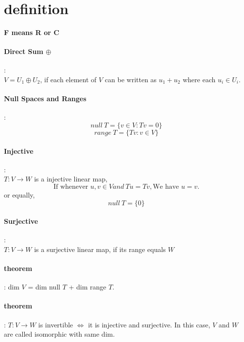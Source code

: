 \documentclass[letterpaper]{article}
\begin{document}
	
\section{definition}
\paragraph{F means R or C}
\paragraph{Direct Sum $\oplus$}:\\
$V=U_1\oplus U_2$, if each element of $V$ can be written as $u_1+u_2$ where each $u_i \in U_i$.
\paragraph{Null Spaces and Ranges}:\\
\begin{displaymath}
null\ T = \{v \in V : Tv = 0\}
\end{displaymath}
\begin{displaymath}
range\ T = \{Tv  : v \in V\}
\end{displaymath}
\paragraph{Injective}:\\
$T: V \to W$ is a injective linear map,
\begin{displaymath}
\textrm{If whenever }u,v \in V and\  Tu=Tv, \textrm{We have }u=v.
\end{displaymath}
or equally,
\begin{displaymath}
null\ T =\{0\}
\end{displaymath}
\paragraph{Surjective}:\\
$T: V \to W$ is a surjective linear map, if its range equals $W$
\paragraph{theorem}:
dim $V$ = dim null $T$ + dim range $T$.
\paragraph{theorem}:
$T: V \to W$ is invertible $\iff$ it is injective and surjective. In this case, $V$ and $W$ are called isomorphic with same dim.
\end{document}

